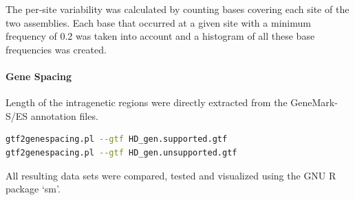 \documentclass[12pt,a4paper]{scrartcl}
\begin{document}
The per-site variability was calculated by counting bases covering each
site of the two assemblies. Each base that occurred at a given site with
a minimum frequency of \num{0.2} was taken into account and a histogram of
all these base frequencies was created.

\paragraph{Gene Spacing}

Length of the intragenetic regions were directly extracted from the
GeneMark-S/ES annotation files.

\begin{lstlisting}[language=bash]
gtf2genespacing.pl --gtf HD_gen.supported.gtf 
gtf2genespacing.pl --gtf HD_gen.unsupported.gtf
\end{lstlisting}

All resulting data sets were compared, tested and visualized using the
GNU R package `sm'.

\printbibliography
\end{document}
